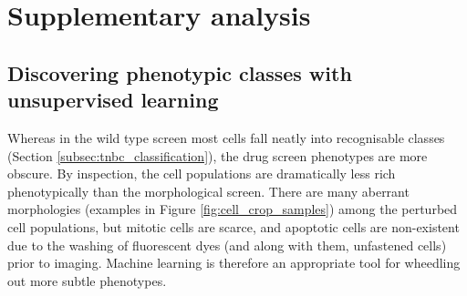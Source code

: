 
\chapter{Supplementary analysis} %
\label{AppendixD} %


\section{Discovering phenotypic classes with unsupervised learning}

Whereas in the wild type screen  most cells fall neatly into recognisable classes (Section \ref{subsec:tnbc_classification}), the drug screen phenotypes are more obscure. By inspection, the cell populations are dramatically less rich phenotypically than the morphological screen. There are many aberrant morphologies (examples in Figure \ref{fig:cell_crop_samples}) among the perturbed cell populations, but mitotic cells are scarce, and apoptotic cells are non-existent due to the washing of fluorescent dyes (and along with them, unfastened cells) prior to imaging. Machine learning is therefore an appropriate tool for wheedling out more subtle phenotypes.

